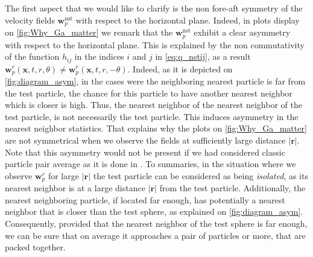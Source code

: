 The first aspect that we would like to clarify is the non fore-aft symmetry of the velocity fields $\textbf{w}_p^\text{nst}$ with respect to the horizontal plane. 
Indeed, in plots display on \ref{fig:Why_Ga_matter} we remark that the $\textbf{w}_p^\text{nst}$ exhibit a clear asymmetry with respect to the horizontal plane.
This is explained by the non commutativity of the function $h_{ij}$ in the indices $i$ and $j$ in \ref{eq:q_nstij}, as a result $\textbf{w}_p^r(\textbf{x},t,r,\theta) \neq \textbf{w}_p^r(\textbf{x},t,r,-\theta)$. 
Indeed, as it is depicted on \ref{fig:diagram_asym}, in the cases were the neighboring nearest particle is far from the test particle, the chance for this particle to have another nearest neighbor which is closer is high. 
Thus, the nearest neighbor of the nearest neighbor of the test particle, is not necessarily the test particle. 
This induces asymmetry in the nearest neighbor statistics. 
That explains why the plots on \ref{fig:Why_Ga_matter} are not symmetrical when we observe the fields at sufficiently large distance $|\textbf{r}|$. 
Note that this asymmetry would not be present if we had considered classic particle pair average as it is done in \cite{shajahan2023inertial}. 
To summaries, in the situation where we observe $\textbf{w}_p^r$ for large $|\textbf{r}|$ the test particle can be considered as being \textit{isolated}, as its nearest neighbor is at a large distance $|\textbf{r}|$ from the test particle. 
Additionally, the nearest neighboring particle, if located far enough, has 
potentially a nearest neighbor that is closer than the test sphere, as explained on \ref{fig:diagram_asym}. 
Consequently, provided that the nearest neighbor of the test sphere is far enough, we can be sure that on average it approaches a pair of particles or more, that are packed together. 

